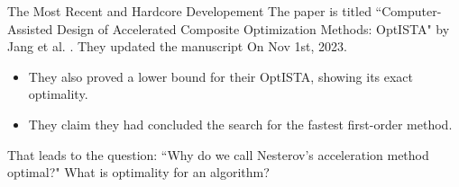 \documentclass[11pt]{beamer}
\theoremstyle{definition}
\begin{document}
    \begin{frame}{The Most Recent and Hardcore Developement}
        The paper is titled ``Computer-Assisted Design of Accelerated Composite Optimization Methods: OptISTA" by Jang et al. \cite{jang_computer-assisted_2023}.
        They updated the manuscript On Nov 1st, 2023. 
        \begin{itemize}
            \item They also proved a lower bound for their OptISTA, showing its exact optimality. 
            \item They claim they had concluded the search for the fastest first-order method. 
        \end{itemize}
        That leads to the question: ``Why do we call Nesterov's acceleration method optimal?" 
        What is optimality for an algorithm? 
    \end{frame}
    
   
\end{document}
